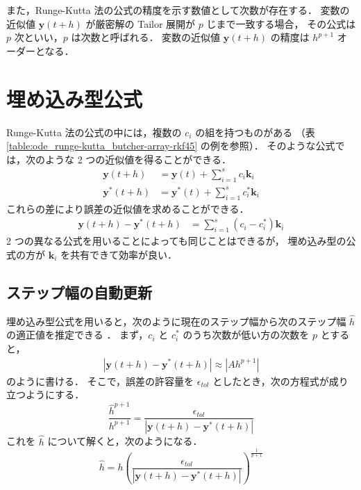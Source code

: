 また，Runge-Kutta 法の公式の精度を示す数値として次数が存在する．
変数の近似値 $\bm{y}(t + h)$ が厳密解の Tailor 展開が $p$ じまで一致する場合，
その公式は $p$ 次といい，$p$ は次数と呼ばれる．
変数の近似値 $\bm{y}(t + h)$ の精度は $h^{p+1}$ オーダーとなる．

\section{埋め込み型公式}

Runge-Kutta 法の公式の中には，複数の $c_i$ の組を持つものがある
（表 \ref{table:ode_runge-kutta_butcher-array-rkf45} の例を参照）．
そのような公式では，次のような 2 つの近似値を得ることができる．
\begin{align}
    \bm{y}(t + h)   & = \bm{y}(t) + \sum_{i=1}^s c_i \bm{k}_i     \\
    \bm{y}^*(t + h) & = \bm{y}^*(t) + \sum_{i=1}^s c_i^* \bm{k}_i
\end{align}
これらの差により誤差の近似値を求めることができる．
\begin{align}
    \bm{y}(t + h) - \bm{y}^*(t + h) & = \sum_{i=1}^s (c_i - c_i^*) \bm{k}_i
\end{align}
2 つの異なる公式を用いることによっても同じことはできるが，
埋め込み型の公式の方が $\bm{k}_i$ を共有できて効率が良い．

\subsection{ステップ幅の自動更新}

埋め込み型公式を用いると，次のように現在のステップ幅から次のステップ幅 $\hat{h}$ の適正値を推定できる
\cite[4.1 節 (a)]{Mitsui1993}．
まず，$c_i$ と $c_i^*$ のうち次数が低い方の次数を $p$ とすると，
\begin{align}
    \left| \bm{y}(t + h) - \bm{y}^*(t + h) \right| \approx |Ah^{p+1}|
    \label{eq:ode_runge-kutta_error-using-embedded-formula}
\end{align}
のように書ける．
そこで，誤差の許容量を $\epsilon_{tol}$ としたとき，次の方程式が成り立つようにする．
\begin{equation}
    \frac{\hat{h}^{p+1}}{h^{p+1}}
    = \frac{\epsilon_{tol}}{\left| \bm{y}(t + h) - \bm{y}^*(t + h) \right|}
\end{equation}
これを $\hat{h}$ について解くと，次のようになる．
\begin{equation}
    \hat{h} = h
    \left(\frac{\epsilon_{tol}}{\left| \bm{y}(t + h) - \bm{y}^*(t + h) \right|}\right)^{\frac{1}{p+1}}
    \label{eq:ode_runge-kutta_auto-next-step-size}
\end{equation}

